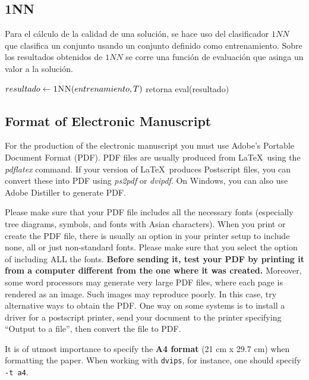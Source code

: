 \documentclass[11pt]{article}
\begin{document}
\subsection{1NN}
    Para el cálculo de la calidad de una solución, se hace uso del clasificador $1NN$ que clasifica un conjunto usando un conjunto definido como entrenamiento. Sobre los resultados obtenidos de $1NN$ se corre una función de evaluación que asinga un valor a la solución.

    \begin{algorithmic}
            \State {}
            \State {}
            \State $resultado \gets \Call{1NN}{entrenamiento, T}$
            \State retorna eval(resultado)
        \EndFunction
    \end{algorithmic}



\subsection{Format of Electronic Manuscript}
\label{sect:pdf}

For the production of the electronic manuscript you must use Adobe's
Portable Document Format (PDF). PDF files are usually produced from
\LaTeX\ using the \textit{pdflatex} command. If your version of
\LaTeX\ produces Postscript files, you can convert these into PDF
using \textit{ps2pdf} or \textit{dvipdf}. On Windows, you can also use
Adobe Distiller to generate PDF.

Please make sure that your PDF file includes all the necessary fonts
(especially tree diagrams, symbols, and fonts with Asian
characters). When you print or create the PDF file, there is usually
an option in your printer setup to include none, all or just
non-standard fonts.  Please make sure that you select the option of
including ALL the fonts. \textbf{Before sending it, test your PDF by
  printing it from a computer different from the one where it was
  created.} Moreover, some word processors may generate very large PDF
files, where each page is rendered as an image. Such images may
reproduce poorly. In this case, try alternative ways to obtain the
PDF. One way on some systems is to install a driver for a postscript
printer, send your document to the printer specifying ``Output to a
file'', then convert the file to PDF.

It is of utmost importance to specify the \textbf{A4 format} (21 cm
x 29.7 cm) when formatting the paper. When working with
{\tt dvips}, for instance, one should specify {\tt -t a4}.
\end{document}
